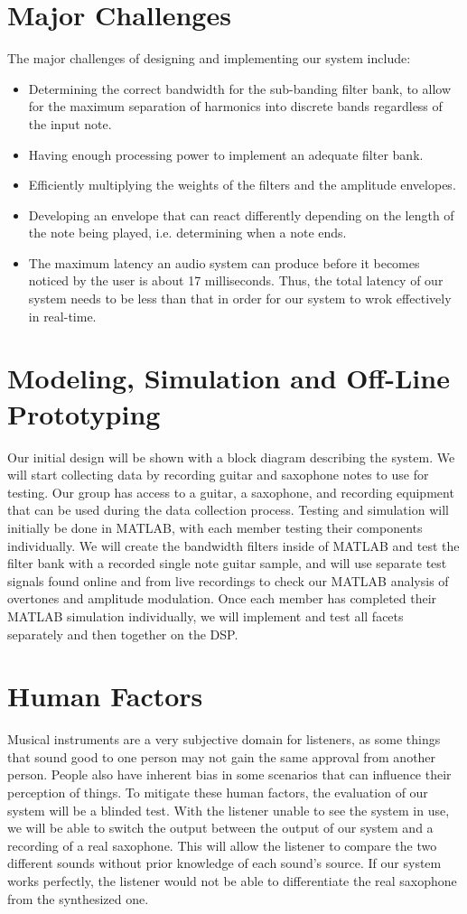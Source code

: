 \documentclass{article}
\begin{document}
\section{Major Challenges}
The major challenges of designing and implementing our system include:
\begin{itemize}
\item Determining the correct bandwidth for the sub-banding filter bank, to allow for the maximum separation of harmonics into discrete bands regardless of the input note.
\item Having enough processing power to implement an adequate filter bank.
\item Efficiently multiplying the weights of the filters and the amplitude envelopes.
\item Developing an envelope that can react differently depending on the length of the note being played, i.e. determining when a note ends.
\item The maximum latency an audio system can produce before it becomes noticed by the user is about 17 milliseconds. Thus, the total latency of our system needs to be less than that in order for our system to wrok effectively in real-time.
\end{itemize}

\section{Modeling, Simulation and Off-Line Prototyping}
Our initial design will be shown with a block diagram describing the system. We will start collecting data by recording guitar and saxophone notes to use for testing. Our group has access to a guitar, a saxophone, and recording equipment that can be used during the data collection process. Testing and simulation will initially be done in MATLAB, with each member testing their components individually. We will create the bandwidth filters inside of MATLAB and test the filter bank with a recorded single note guitar sample, and will use separate test signals found online and from live recordings to check our MATLAB analysis of overtones and amplitude modulation. Once each member has completed their MATLAB simulation individually, we will implement and test all facets separately and then together on the DSP. 

\section{Human Factors} 
Musical instruments are a very subjective domain for listeners, as some things that sound good to one person may not gain the same approval from another person. People also have inherent bias in some scenarios that can influence their perception of things. To mitigate these human factors, the evaluation of our system will be a blinded test. With the listener unable to see the system in use, we will be able to switch the output between the output of our system and a recording of a real saxophone. This will allow the listener to compare the two different sounds without prior knowledge of each sound's source. If our system works perfectly, the listener would not be able to differentiate the real saxophone from the synthesized one.
\end{document}
